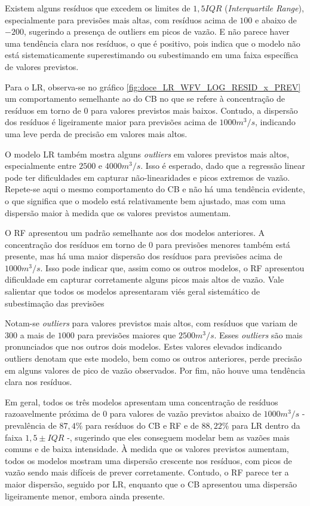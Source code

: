 Existem alguns resíduos que excedem os limites de $1,5 IQR$ (\textit{Interquartile Range}), especialmente para previsões mais altas, com resíduos acima de $100$ e abaixo de $-200$, sugerindo a presença de outliers em picos de vazão. E não parece haver uma tendência clara nos resíduos, o que é positivo, pois indica que o modelo não está sistematicamente superestimando ou subestimando em uma faixa específica de valores previstos.

Para o LR, observa-se no gráfico \ref{fig:doce_LR_WFV_LOG_RESID_x_PREV} um comportamento semelhante ao do CB no que se refere à concentração de resíduos em torno de $0$ para valores previstos mais baixos. Contudo, a dispersão dos resíduos é ligeiramente maior para previsões acima de $1000 m^3/s$, indicando uma leve perda de precisão em valores mais altos.

O modelo LR também mostra alguns \textit{outliers} em valores previstos mais altos, especialmente entre $2500$ e $4000 m^3/s$. Isso é esperado, dado que a regressão linear pode ter dificuldades em capturar não-linearidades e picos extremos de vazão. Repete-se aqui o mesmo comportamento do CB e não há uma tendência evidente, o que significa que o modelo está relativamente bem ajustado, mas com uma dispersão maior à medida que os valores previstos aumentam.

O RF apresentou um padrão semelhante aos dos modelos anteriores. A concentração dos resíduos em torno de $0$ para previsões menores também está presente, mas há uma maior dispersão dos resíduos para previsões acima de $1000 m^3/s$. Isso pode indicar que, assim como os outros modelos, o RF apresentou dificuldade em capturar corretamente alguns picos mais altos de vazão. Vale salientar que todos os modelos apresentaram viés geral sistemático de subestimação das previsões

Notam-se \textit{outliers} para valores previstos mais altos, com resíduos que variam de $300$ a mais de $1000$ para previsões maiores que $2500 m^3/s$. Esses \textit{outliers} são mais pronunciados que nos outros dois modelos. Estes valores elevados indicando outliers denotam que este modelo, bem como os outros anteriores, perde precisão em alguns valores de pico de vazão observados. Por fim, não houve uma tendência clara nos resíduos.

Em geral, todos os três modelos apresentam uma concentração de resíduos razoavelmente próxima de $0$ para valores de vazão previstos abaixo de $1000 m^3/s$ - prevalência de $87,4\%$ para resíduos do CB e RF e de $88,22\%$ para LR dentro da faixa $1,5 \pm IQR$ -, sugerindo que eles conseguem modelar bem as vazões mais comuns e de baixa intensidade. À medida que os valores previstos aumentam, todos os modelos mostram uma dispersão crescente nos resíduos, com picos de vazão sendo mais difíceis de prever corretamente. Contudo, o RF parece ter a maior dispersão, seguido por LR, enquanto que o CB apresentou uma dispersão ligeiramente menor, embora ainda presente.

